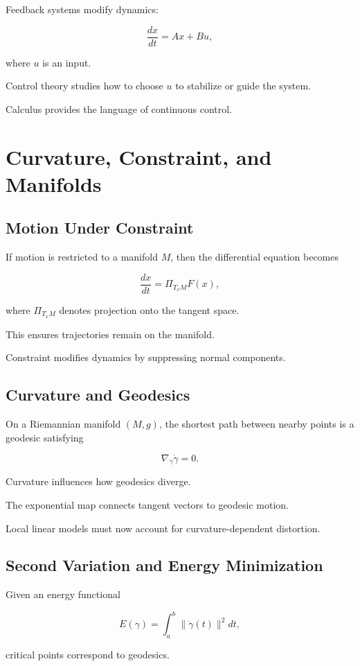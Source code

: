 \documentclass[12pt]{book}
\begin{document}
Feedback systems modify dynamics:

\[
\frac{dx}{dt} = Ax + Bu,
\]

where $u$ is an input.

Control theory studies how to choose $u$ to stabilize or guide the system.

Calculus provides the language of continuous control.

\chapter{Curvature, Constraint, and Manifolds}

\section{Motion Under Constraint}

If motion is restricted to a manifold $M$, then the differential equation becomes

\[
\frac{dx}{dt} = \Pi_{T_x M} F(x),
\]

where $\Pi_{T_x M}$ denotes projection onto the tangent space.

This ensures trajectories remain on the manifold.

Constraint modifies dynamics by suppressing normal components.

\section{Curvature and Geodesics}

On a Riemannian manifold $(M, g)$, the shortest path between nearby points is a geodesic satisfying

\[
\nabla_{\dot{\gamma}} \dot{\gamma} = 0.
\]

Curvature influences how geodesics diverge.

The exponential map connects tangent vectors to geodesic motion.

Local linear models must now account for curvature-dependent distortion.

\section{Second Variation and Energy Minimization}

Given an energy functional

\[
E(\gamma) = \int_a^b \|\dot{\gamma}(t)\|^2 dt,
\]

critical points correspond to geodesics.
\end{document}
